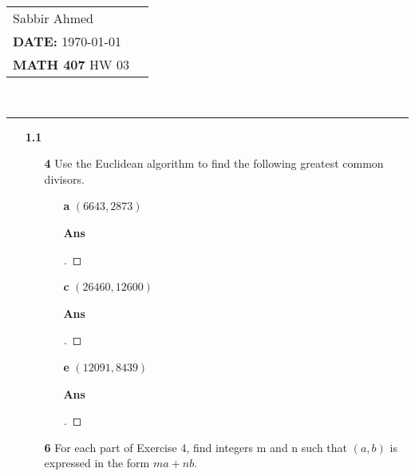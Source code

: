 \documentclass[paper=usletter, fontsize=12pt]{article}
\newcommand{\documentinfo}[5]{
    \begin{centering}
        \parbox{2in}{
        \begin{spacing}{1}
            \begin{flushleft}
                \begin{tabular}{l l}
                    #1 \\
                    #2 \\
                    #3 \\
                \end{tabular}\\
                \rule{\textwidth}{1pt}
            \end{flushleft}
        \end{spacing}
        }
    \end{centering}
}
\begin{document}
    \documentinfo{Sabbir Ahmed}{\textbf{DATE:} \today}{\textbf{MATH 407} HW 03}
    \vspace{-0.2in}

    \begin{itemize}

        \item[\textbf{1.1}]

            \begin{itemize}

                \item[\textbf{4}] Use the Euclidean algorithm to find the
                following greatest common divisors.

                \begin{itemize}

                    \item[\textbf{a}] $(6643, 2873)$
                    \item[\textbf{Ans}]
                    \begin{proof}[\unskip\nopunct]
                    \end{proof}
                    \vspace{0.2in}

                    \item[\textbf{c}] $(26460, 12600)$
                    \item[\textbf{Ans}]
                    \begin{proof}[\unskip\nopunct]
                    \end{proof}
                    \vspace{0.2in}

                    \item[\textbf{e}] $(12091, 8439)$
                    \item[\textbf{Ans}]
                    \begin{proof}[\unskip\nopunct]
                    \end{proof}
                    \vspace{0.2in}

                \end{itemize}

                \item[\textbf{6}] For each part of Exercise 4, find integers m
                and n such that $(a, b)$ is expressed in the form $ma + nb$.



\end{itemize}
\end{itemize}
\end{document}
